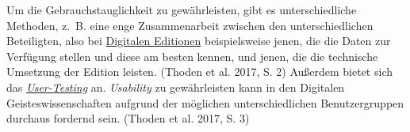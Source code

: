 \documentclass{article}
\begin{document}
        Um die Gebrauchstauglichkeit zu gewährleisten, gibt es unterschiedliche Methoden,
                  z. B. eine enge Zusammenarbeit zwischen den unterschiedlichen Beteiligten, also
                  bei \href{http://gams.uni-graz.at/o:konde.59}{Digitalen Editionen}
                  beispielsweise jenen, die die Daten zur Verfügung stellen und diese am besten
                  kennen, und jenen, die die technische Umsetzung der Edition leisten. (Thoden
                     et al. 2017, S. 2) Außerdem bietet sich das \emph{\href{http://gams.uni-graz.at/o:konde.206}{User-Testing}} an. \emph{Usability} zu gewährleisten kann in den Digitalen
                  Geisteswissenschaften aufgrund der möglichen unterschiedlichen Benutzergruppen
                  durchaus fordernd sein. (Thoden et al. 2017, S. 3)\\
            
\end{document}
